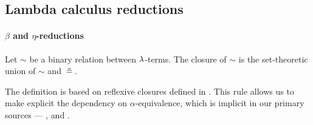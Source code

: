 \subsection{Lambda calculus reductions}\label{subsec:lambda_calculus_reductions}

\paragraph{\( \beta \) and \( \eta \)-reductions}

\begin{definition}\label{def:alpha_reflexive_closure}\mimprovised
  Let \( {\sim} \) be a binary relation between \( \mathrm{\lambda} \)-terms. The  closure of \( {\sim} \) is the set-theoretic union of \( {\sim} \) and \( {\aequiv} \).
\end{definition}
\begin{comments}
  \item The definition is based on reflexive closures defined in . This rule allows us to make explicit the dependency on \( \alpha \)-equivalence, which is implicit in our primary sources --- \cite[ch. 3]{Barendregt1984}, \cite[1B2]{Hindley1997} and \cite[191]{Герасимов2011}.
\end{comments}

